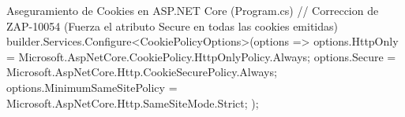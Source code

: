 \begin{cmdbox}{Aseguramiento de Cookies en ASP.NET Core (Program.cs)}
// Correccion de ZAP-10054 (Fuerza el atributo Secure en todas las cookies emitidas)
builder.Services.Configure<CookiePolicyOptions>(options =>
{
    options.HttpOnly = Microsoft.AspNetCore.CookiePolicy.HttpOnlyPolicy.Always;
    options.Secure = Microsoft.AspNetCore.Http.CookieSecurePolicy.Always;
    options.MinimumSameSitePolicy = Microsoft.AspNetCore.Http.SameSiteMode.Strict;
});
\end{cmdbox}
